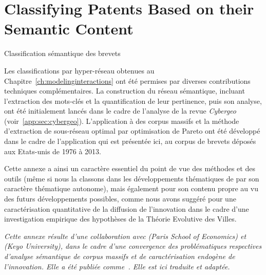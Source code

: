 



\newpage


\section{Classifying Patents Based on their Semantic Content}{Classification sémantique des brevets}

\label{app:sec:patentsmining}


Les classifications par hyper-réseau obtenues au Chapitre~\ref{ch:modelinginteractions} ont été permises par diverses contributions techniques complémentaires. La construction du réseau sémantique, incluant l'extraction des mots-clés et la quantification de leur pertinence, puis son analyse, ont été initialement lancés dans le cadre de l'analyse de la revue \emph{Cybergeo} (voir~\ref{app:sec:cybergeo}). L'application à des corpus massifs et la méthode d'extraction de sous-réseau optimal par optimisation de Pareto ont été développé dans le cadre de l'application qui est présentée ici, au corpus de brevets déposés aux Etats-unis de 1976 à 2013.

Cette annexe a ainsi un caractère essentiel du point de vue des méthodes et des outils (même si nous la classons dans les développements thématiques de par son caractère thématique autonome), mais également pour son contenu propre au vu des futurs développements possibles, comme nous avons suggéré pour une caractérisation quantitative de la diffusion de l'innovation dans le cadre d'une investigation empirique des hypothèses de la Théorie Evolutive des Villes.


\stars


\textit{Cette annexe résulte d'une collaboration avec  (Paris School of Economics) et  (Keyo University), dans le cadre d'une convergence des problématiques respectives d'analyse sémantique de corpus massifs et de caractérisation endogène de l'innovation. Elle a été publiée comme~\cite{10.1371/journal.pone.0176310}. Elle est ici traduite et adaptée.}


\stars


